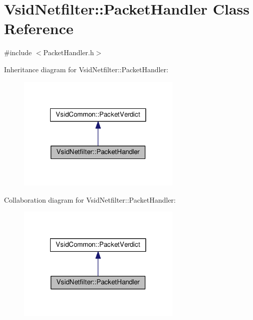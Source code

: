 \hypertarget{class_vsid_netfilter_1_1_packet_handler}{\section{Vsid\-Netfilter\-:\-:Packet\-Handler Class Reference}
\label{class_vsid_netfilter_1_1_packet_handler}
}


{\ttfamily \#include $<$Packet\-Handler.\-h$>$}



Inheritance diagram for Vsid\-Netfilter\-:\-:Packet\-Handler\-:
\nopagebreak
\begin{figure}[H]
\begin{center}
\leavevmode
\includegraphics[width=222pt]{class_vsid_netfilter_1_1_packet_handler__inherit__graph}
\end{center}
\end{figure}


Collaboration diagram for Vsid\-Netfilter\-:\-:Packet\-Handler\-:
\nopagebreak
\begin{figure}[H]
\begin{center}
\leavevmode
\includegraphics[width=222pt]{class_vsid_netfilter_1_1_packet_handler__coll__graph}
\end{center}
\end{figure}
